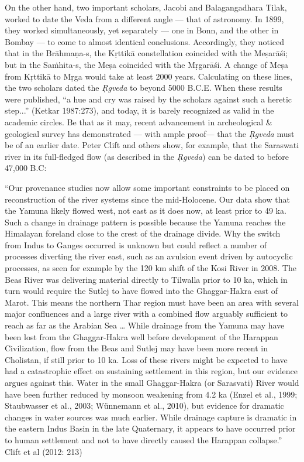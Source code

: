 On the other hand, two important scholars, Jacobi and Balagangadhara Tilak, worked to date the Veda from a different angle --- that of astronomy. In 1899, they worked simultaneously, yet separately --- one in Bonn, and the other in Bombay --- to come to almost identical conclusions. Accordingly, they noticed that in the Brāhmaṇa-s, the Kṛttikā constellation coincided with the Meṣarāśi; but in the Saṁhita-s, the Meṣa coincided with the Mṛgarāśi. A change of Meṣa from Kṛttikā to Mṛga would take at least 2000 years. Calculating on these lines, the two scholars dated the {\sl Ṛgveda} to beyond 5000 B.C.E.  When these results were published, “a hue and cry was raised by the scholars against such a heretic step...” (Ketkar 1987:273), and today, it is barely recognized as valid in the academic circles. Be that as it may, recent advancement in archeological \& geological survey has demonstrated --- with ample proof--- that the {\sl Ṛgveda} must be of an earlier date. Peter Clift and others show, for example, that the Saraswati river in its full-fledged flow (as described in the {\sl Ṛgveda}) can be dated to before 47,000 B.C: 

\begin{myquote}
“Our provenance studies now allow some important constraints to be placed on reconstruction of the river systems since the mid-Holocene. Our data show that the Yamuna likely flowed west, not east as it does now, at least prior to 49 ka. Such a change in drainage pattern is possible because the Yamuna reaches the Himalayan foreland close to the crest of the drainage divide. Why the switch from Indus to Ganges occurred is unknown but could reflect a number of processes diverting the river east, such  as an avulsion event driven by autocyclic processes, as seen for example by the 120 km shift of the Kosi River in 2008. The Beas River was delivering material directly to Tilwalla prior to 10 ka, which in turn would require the Sutlej to have flowed into the Ghaggar-Hakra east of Marot. This means the northern Thar region must have been an area with several major confluences and a large river with a combined flow arguably sufficient to reach as far as the Arabian Sea … While drainage from the Yamuna may have been lost from the Ghaggar-Hakra well before development of the Harappan Civilization, flow from the Beas and Sutlej may have been more recent in Cholistan, if still prior to 10 ka. Loss of these rivers might be expected to have had a catastrophic effect on sustaining settlement in this region, but our evidence argues against this. Water in the small Ghaggar-Hakra (or Sarasvati) River would have been further reduced by monsoon weakening from 4.2 ka (Enzel et al., 1999; Staubwasser et al., 2003; Wünnemann et al., 2010), but evidence for dramatic changes in water sources was much earlier. While drainage capture is dramatic in the eastern Indus Basin in the late Quaternary, it appears to have occurred prior to human settlement and not to have directly caused the Harappan collapse.”
\hfill Clift et al (2012: 213)
\end{myquote}


